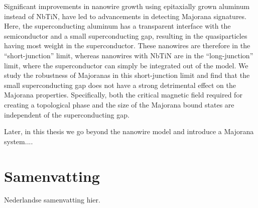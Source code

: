 Significant improvements in nanowire growth using epitaxially grown aluminum instead of NbTiN, have led to advancements in detecting Majorana signatures.
Here, the superconducting aluminum has a transparent interface with the semiconductor and a small superconducting gap, resulting in the quasiparticles having most weight in the superconductor.
These nanowires are therefore in the ``short-junction'' limit, whereas nanowires with NbTiN are in the ``long-junction'' limit, where the superconductor can simply be integrated out of the model.
We study the robustness of Majoranas in this short-junction limit and find that the small superconducting gap does not have a strong detrimental effect on the Majorana properties.
Specifically, both the critical magnetic field required for creating a topological phase and the size of the Majorana bound states are independent of the superconducting gap.

Later, in this thesis we go beyond the nanowire model and introduce a Majorana system....

\chapter*{Samenvatting}
{

Nederlandse samenvatting hier.

}